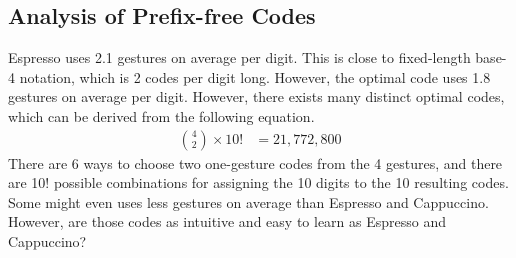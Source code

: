 \subsection{Analysis of Prefix-free Codes}
Espresso uses 2.1 gestures on average per digit. This is close to fixed-length base-4 notation, which is 2 codes per digit long. However, the optimal code uses 1.8 gestures on average per digit. However, there exists many distinct optimal codes, which can be derived from the following equation.
  \begin{align*}
    {4 \choose 2} \times 10! &= 21,772,800
  \end{align*}
There are 6 ways to choose two one-gesture codes from the 4 gestures, and there are 10! possible combinations for assigning the 10 digits to the 10 resulting codes. Some might even uses less gestures on average than Espresso and Cappuccino. However, are those codes as intuitive and easy to learn as Espresso and Cappuccino?